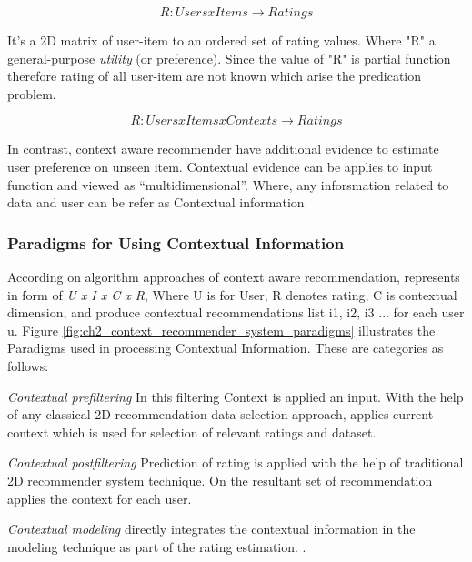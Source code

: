 \begin{equation} 
R : Users x Items \rightarrow Ratings
\end{equation}

It’s a 2D matrix of user-item to an ordered set of rating values. Where "R" a general-purpose \textit{utility} (or preference). Since the value of "R" is partial function therefore rating of all user-item are not known which arise the predication problem.

\begin{equation} 
R : Users x Items x Contexts \rightarrow Ratings
\end{equation}

In contrast, context aware recommender have additional evidence to estimate user preference on unseen item. Contextual evidence can be applies to input function and viewed as “multidimensional”. Where, any inforsmation related to data and user can be refer as Contextual information

\subsubsection{Paradigms for Using Contextual Information}

According on algorithm approaches of context aware recommendation, represents in form of \textit{U x I x C x R}, Where U is for User, R denotes rating, C is contextual dimension, and produce contextual recommendations list i1, i2, i3 ... for each user u. Figure \ref{fig:ch2_context_recommender_system_paradigms} illustrates the Paradigms used in processing Contextual Information. These are categories as follows:\newline

\textit{Contextual prefiltering} In this filtering Context is applied an input. With the help of any classical 2D recommendation data selection approach, applies current context which is used for selection of relevant ratings and dataset.\newline

\textit{Contextual postfiltering} Prediction of rating is applied with the help of traditional 2D recommender system technique. On the resultant set of recommendation applies the context for each user. \newline

\textit{Contextual modeling} directly integrates the contextual information in the modeling technique as part of the rating estimation. .\newline


